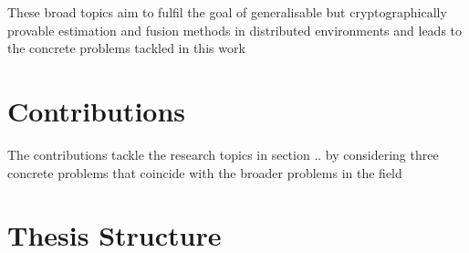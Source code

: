These broad topics aim to fulfil the goal of generalisable but cryptographically provable estimation and fusion methods in distributed environments and leads to the concrete problems tackled in this work

% 
%                                                
%                                                
%                                                
% 
\section{Contributions}

The contributions tackle the research topics in section .. by considering three concrete problems that coincide with the broader problems in the field


% 
%                                                                    
%                                                                    
%                                                                    
% 
\section{Thesis Structure}
